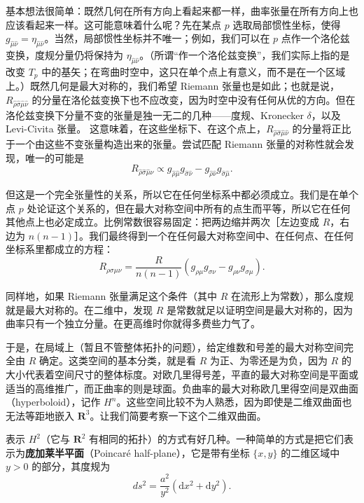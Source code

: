 基本想法很简单：既然几何在所有方向上看起来都一样，曲率张量在所有方向上也应该看起来一样。这可能意味着什么呢？先在某点 $p$ 选取局部惯性坐标，使得 $g_{\hat\mu\hat\nu} = \eta_{\hat\mu\hat\nu}$。当然，局部惯性坐标并不唯一；例如，我们可以在 $p$ 点作一个洛伦兹变换，度规分量仍将保持为 $\eta_{\hat\mu\hat\nu}$。（所谓“作一个洛伦兹变换”，我们实际上指的是改变 $T_p$ 中的基矢；在弯曲时空中，这只在单个点上有意义，而不是在一个区域上。）既然几何是最大对称的，我们希望 Riemann 张量也是如此；也就是说，$R_{\hat\rho\hat\sigma\hat\mu\hat\nu}$ 的分量在洛伦兹变换下也不应改变，因为时空中没有任何从优的方向。但在洛伦兹变换下分量不变的张量是独一无二的几种——度规、Kronecker $\delta$，以及 Levi-Civita 张量。
这意味着，在这些坐标下、在这个点上，$R_{\hat\rho\hat\sigma\hat\mu\hat\nu}$ 的分量将正比于一个由这些不变张量构造出来的张量。尝试匹配 Riemann 张量的对称性就会发现，唯一的可能是
\begin{equation*}
R_{\hat\rho\hat\sigma\hat\mu\hat\nu} \propto g_{\hat\rho\hat\mu}g_{\hat\sigma\hat\nu} - g_{\hat\rho\hat\nu}g_{\hat\sigma\hat\mu}.
\tag{3.190}
\end{equation*}

但这是一个完全张量性的关系，所以它在任何坐标系中都必须成立。我们是在单个点 $p$ 处论证这个关系的，但在最大对称空间中所有的点生而平等，所以它在任何其他点上也必定成立。比例常数很容易固定：把两边缩并两次［左边变成 $R$，右边为 $n(n-1)$］。我们最终得到一个在任何最大对称空间中、在任何点、在任何坐标系里都成立的方程：
\begin{equation*}
R_{\rho\sigma\mu\nu} = \frac{R}{n(n-1)}(g_{\rho\mu}g_{\sigma\nu} - g_{\rho\nu}g_{\sigma\mu}).
\tag{3.191}
\end{equation*}

同样地，如果 Riemann 张量满足这个条件（其中 $R$ 在流形上为常数），那么度规就是最大对称的。在二维中，发现 $R$ 是常数就足以证明空间是最大对称的，因为曲率只有一个独立分量。在更高维时你就得多费些力气了。

于是，在局域上（暂且不管整体拓扑的问题），给定维数和号差的最大对称空间完全由 $R$ 确定。这类空间的基本分类，就是看 $R$ 为正、为零还是为负，因为 $R$ 的大小代表着空间尺寸的整体标度。对欧几里得号差，平直的最大对称空间是平面或适当的高维推广，而正曲率的则是球面。负曲率的最大对称欧几里得空间是双曲面（hyperboloid），记作 $H^n$。这些空间比较不为人熟悉，因为即使是二维双曲面也无法等距地嵌入 $\mathbf{R}^3$。让我们简要考察一下这个二维双曲面。

表示 $H^2$（它与 $\mathbf{R}^2$ 有相同的拓扑）的方式有好几种。一种简单的方式是把它们表示为\textbf{庞加莱半平面}（Poincaré half-plane），它是带有坐标 $\{x, y\}$ 的二维区域中 $y > 0$ 的部分，其度规为
\begin{equation*}
ds^2 = \frac{a^2}{y^2}(\mathrm{d}x^2 + \mathrm{d}y^2).
\tag{3.192}
\end{equation*}

